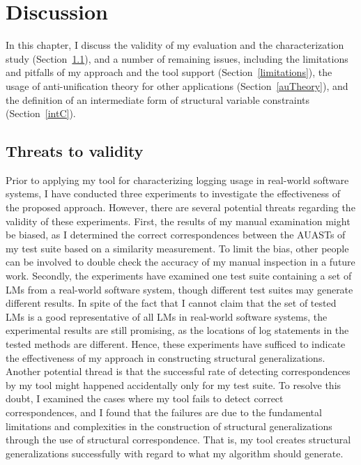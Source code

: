 \chapter{Discussion}  \label{diss}

In this chapter, I discuss the validity of my evaluation and the characterization study (Section~\ref{threads}), and a number of remaining issues, including the limitations and pitfalls of my approach and the tool support (Section~\ref{limitations}), the usage of anti-unification theory for other applications (Section~\ref{auTheory}), and the definition of an intermediate form of structural variable constraints (Section~\ref{intC}).

\section{Threats to validity}  \label{threads}
Prior to applying my tool for characterizing logging usage in real-world software systems, I have conducted three experiments to investigate the effectiveness of the proposed approach. However, there are several potential threats regarding the validity of these experiments. First, the results of my manual examination might be biased, as I determined the correct correspondences between the AUASTs of my test suite based on a similarity measurement. To limit the bias, other people can be involved to double check the accuracy of my manual inspection in a future work. Secondly, the experiments have examined one test suite containing a set of LMs from a real-world software system, though different test suites may generate different results. In spite of the fact that I cannot claim that the set of tested LMs is a good representative of all LMs in real-world software systems, the experimental results are still promising, as the locations of log statements in the tested methods are different. Hence, these experiments have sufficed to indicate the effectiveness of my approach in constructing structural generalizations. Another potential thread is that the successful rate of detecting correspondences by my tool might happened accidentally only for my test suite. To resolve this doubt, I examined the cases where my tool fails to detect correct correspondences, and I found that the failures are due to the fundamental limitations and complexities in the construction of structural generalizations through the use of structural correspondence. That is, my tool creates structural generalizations successfully with regard to what my algorithm should generate.

